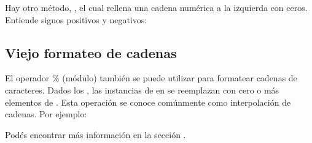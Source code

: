 \documentclass[a4,10pt,spanish]{sphinxmanual}
\begin{document}
\sphinxAtStartPar
Hay otro método, , el cual rellena una cadena numérica a la izquierda con ceros. Entiende signos positivos y negativos:

\begin{sphinxVerbatim}[commandchars=\\\{\}]
\end{sphinxVerbatim}


\subsection{Viejo formateo de cadenas}
\label{\detokenize{tutorial/inputoutput:old-string-formatting}}
\sphinxAtStartPar
El operador \% (módulo) también se puede utilizar para formatear cadenas de caracteres. Dados los , las instancias de \sphinxcode{\sphinxupquote{\%}} en  se reemplazan con cero o más elementos de . Esta operación se conoce comúnmente como interpolación de cadenas. Por ejemplo:

\begin{sphinxVerbatim}[commandchars=\\\{\}]
 
  
\end{sphinxVerbatim}

\sphinxAtStartPar
Podés encontrar más información en la sección .
\end{document}
